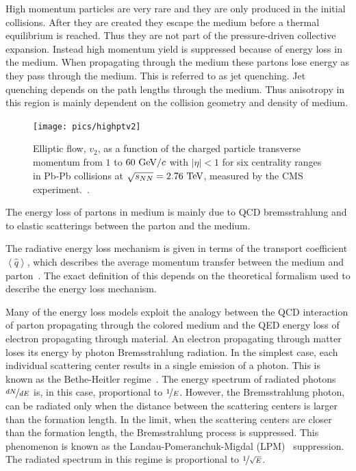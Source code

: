 High momentum particles are very rare and they are only produced in the initial collisions. After they are created they escape the medium before a thermal equilibrium is reached. Thus they are not part of the pressure-driven collective expansion. Instead high momentum yield is suppressed because of energy loss in the medium. When propagating through the medium these partons lose energy as they pass through the medium. This is referred to as jet quenching. Jet quenching depends on the path lengths through the medium. Thus anisotropy in this region is mainly dependent on the collision geometry and density of medium.

\begin{figure}
\centering
\texttt{[image: pics/highptv2]}
\caption[Elliptic flow, $v_2$ from $\pt{}=1$ to $60\gevc$]{ Elliptic flow, $v_2$, as a function of the charged particle transverse momentum from $1$ to $60\gevc$ with $\left|\eta\right|<1$ for six centrality ranges in Pb-Pb collisions at $\sqrt{s_{NN}}=2.76\mbox{~TeV}$, measured by the CMS experiment.~\cite{Chatrchyan:2012xq}. }
\label{fig:highpt}
\end{figure}


The energy loss of partons in medium is mainly due to QCD bremsstrahlung and to elastic scatterings between the parton and the medium. 


The radiative energy loss mechanism is given in terms of the transport coefficient $\left<\hat q\right>$, which describes the average momentum transfer between the medium and parton~\cite{jetBroadeningPpb1}. The exact definition of this depends on the theoretical formalism used to describe the energy loss mechanism. 

Many of the energy loss models exploit the analogy between the QCD interaction of parton propagating through the colored medium and the QED energy loss of electron propagating through material. An electron propagating through matter loses its energy by photon Bremsstrahlung radiation. In the simplest case, each individual scattering center results in a single emission of a photon. This is known as the Bethe-Heitler regime~\cite{BetheHeitler}. The energy spectrum of radiated photons $\nicefrac{dN}{dE}$ is, in this case, proportional to $\nicefrac{1}{E}$. However, the Bremsstrahlung photon, can be radiated only when the distance between the scattering centers is larger than the formation length. In the limit, when the scattering centers are closer than the formation length, the Bremsstrahlung process is suppressed. This phenomenon is known as the Landau-Pomeranchuk-Migdal (LPM)~\cite{Landau:1953um,Migdal:1956tc} suppression. The radiated spectrum in this regime is proportional to $\nicefrac{1}{\sqrt{E}}$.

